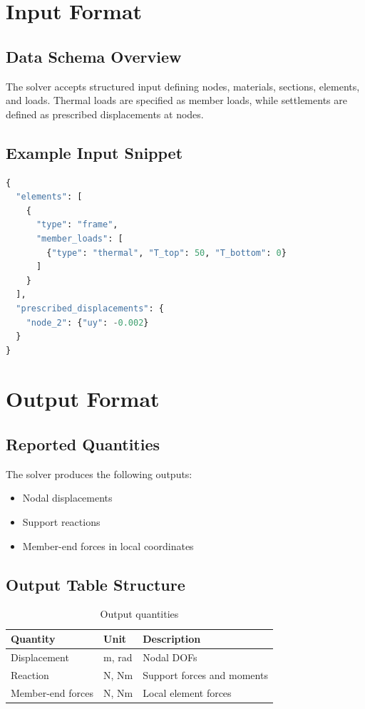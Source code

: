 \section{Input Format}

\subsection{Data Schema Overview}

The solver accepts structured input defining nodes, materials, sections, elements, and loads. Thermal loads are specified as member loads, while settlements are defined as prescribed displacements at nodes.

\subsection{Example Input Snippet}

\begin{lstlisting}[language=Python,caption={Example thermal and settlement input},label={lst:input_snippet}]
{
  "elements": [
    {
      "type": "frame",
      "member_loads": [
        {"type": "thermal", "T_top": 50, "T_bottom": 0}
      ]
    }
  ],
  "prescribed_displacements": {
    "node_2": {"uy": -0.002}
  }
}
\end{lstlisting}
\pagebreak
\section{Output Format}

\subsection{Reported Quantities}

The solver produces the following outputs:

\begin{itemize}
    \item Nodal displacements
    \item Support reactions
    \item Member-end forces in local coordinates
\end{itemize}

\subsection{Output Table Structure}

\begin{table}[H]
    \centering
    \caption{Output quantities}
    \label{tab:output_quantities}
    \begin{tabular}{lll}
        \toprule
        Quantity & Unit & Description \\
        \midrule
        Displacement & m, rad & Nodal DOFs \\
        Reaction & N, Nm & Support forces and moments \\
        Member-end forces & N, Nm & Local element forces \\
        \bottomrule
    \end{tabular}
\end{table}
\pagebreak
